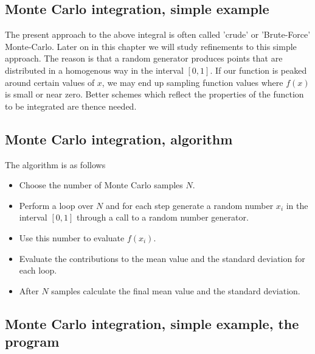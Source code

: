 \documentclass[%
oneside,                 %
final,                   %
10pt]{article}
\newenvironment{block_mdfboxadmon}[1][]{
\begin{block_mdfboxmdframed}[frametitle=#1]
}
{
\end{block_mdfboxmdframed}
}
\begin{document}
\subsection{Monte Carlo integration, simple  example}

\begin{block_mdfboxadmon}[]
The present  approach to the above integral is often called 'crude' or 
'Brute-Force' Monte-Carlo. 
Later on in this chapter we will study refinements to this
simple approach. The reason is that a random generator 
produces 
points that are distributed
in a homogenous way in the interval $[0,1]$.  
If our function is peaked around certain values of $x$,  
we may end 
up sampling function values where 
$f(x)$ is small or near zero. Better schemes which reflect the 
properties of the function to be integrated are thence needed.
\end{block_mdfboxadmon} %



\subsection{Monte Carlo integration, algorithm}

\begin{block_mdfboxadmon}[]
The algorithm is as follows

\begin{itemize}
  \item Choose the number of Monte Carlo samples $N$.

  \item Perform a loop over $N$ and for each step generate a random number $x_i$ in the interval $[0,1]$ through a call  to a random number generator.

  \item Use this number to evaluate $f(x_i)$.

  \item Evaluate the contributions to the mean value and the standard  deviation for each loop.

  \item After $N$ samples calculate the final mean value and the standard deviation.
\end{itemize}

\noindent
\end{block_mdfboxadmon} %



\subsection{Monte Carlo integration, simple  example, the program}
\end{document}
